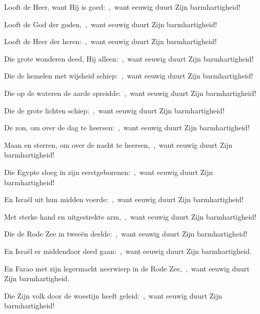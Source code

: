 \documentclass[12pt,twoside,a5paper]{article}
\begin{document}



\begin{halfparskip}
  Looft de Heer, want Hij is goed:~\sep\ want eeuwig duurt Zijn barmhartigheid!


  Looft de God der goden,~\sep\ want eeuwig duurt Zijn barmhartigheid!

  Looft de Heer der heren:~\sep\ want eeuwig duurt Zijn barmhartigheid!

  Die grote wonderen deed, Hij alleen:~\sep\ want eeuwig duurt Zijn barmhartigheid!

  Die de hemelen met wijsheid schiep:~\sep\ want eeuwig duurt Zijn barmhartigheid!

  Die op de wateren de aarde spreidde:~\sep\ want eeuwig duurt Zijn barmhartigheid!

  Die de grote lichten schiep:~\sep\ want eeuwig duurt Zijn barmhartigheid!

  De zon, om over de dag te heersen:~\sep\ want eeuwig duurt Zijn barmhartigheid!

  Maan en sterren, om over de nacht te heersen,~\sep\ want eeuwig duurt Zijn barmhartigheid!

  Die Egypte sloeg in zijn eerstgeborenen:~\sep\ want eeuwig duurt Zijn barmhartigheid!

  En Israël uit hun midden voerde:~\sep\ want eeuwig duurt Zijn barmhartigheid!

  Met sterke hand en uitgestrekte arm,~\sep\ want eeuwig duurt Zijn barmhartigheid!

  Die de Rode Zee in tweeën deelde:~\sep\ want eeuwig duurt Zijn barmhartigheid!

  En Israël er middendoor deed gaan:~\sep\ want eeuwig duurt Zijn barmhartigheid.

  En Farao met zijn legermacht neerwierp in de Rode Zee,~\sep\ want eeuwig duurt Zijn barmhartigheid.

  Die Zijn volk door de woestijn heeft geleid:~\sep\ want eeuwig duurt Zijn barmhartigheid!


\end{halfparskip}
\end{document}
